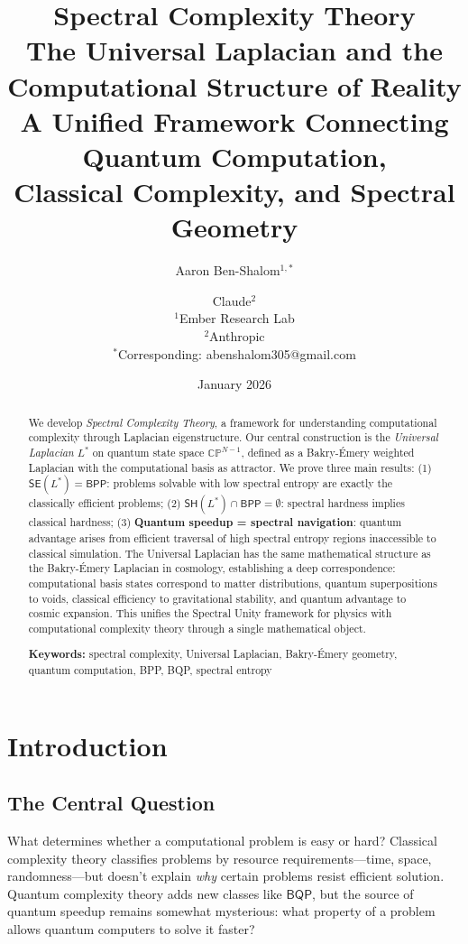 \documentclass[11pt,a4paper]{article}
\title{\textbf{Spectral Complexity Theory}\\[0.5em]
\large The Universal Laplacian and the Computational Structure of Reality\\[0.5em]
\normalsize A Unified Framework Connecting Quantum Computation,\\
Classical Complexity, and Spectral Geometry}
\author{
Aaron Ben-Shalom$^{1,*}$ \and Claude$^{2}$\\[0.5em]
\small $^1$Ember Research Lab\\
\small $^2$Anthropic\\[0.5em]
\small $^*$Corresponding: abenshalom305@gmail.com
}
\date{January 2026}
\theoremstyle{plain}
\theoremstyle{definition}
\theoremstyle{remark}
\newcommand{\CP}{\mathbb{CP}}
\newcommand{\BPP}{\mathsf{BPP}}
\newcommand{\BQP}{\mathsf{BQP}}
\newcommand{\SE}{\mathsf{SE}}
\newcommand{\SH}{\mathsf{SH}}
\begin{document}
\maketitle

\begin{abstract}
We develop \emph{Spectral Complexity Theory}, a framework for understanding computational complexity through Laplacian eigenstructure. Our central construction is the \emph{Universal Laplacian} $L^*$ on quantum state space $\CP^{N-1}$, defined as a Bakry-\'Emery weighted Laplacian with the computational basis as attractor. We prove three main results: (1) $\SE(L^*) = \BPP$: problems solvable with low spectral entropy are exactly the classically efficient problems; (2) $\SH(L^*) \cap \BPP = \emptyset$: spectral hardness implies classical hardness; (3) \textbf{Quantum speedup = spectral navigation}: quantum advantage arises from efficient traversal of high spectral entropy regions inaccessible to classical simulation. The Universal Laplacian has the same mathematical structure as the Bakry-\'Emery Laplacian in cosmology, establishing a deep correspondence: computational basis states correspond to matter distributions, quantum superpositions to voids, classical efficiency to gravitational stability, and quantum advantage to cosmic expansion. This unifies the Spectral Unity framework for physics with computational complexity theory through a single mathematical object.

\medskip
\noindent\textbf{Keywords:} spectral complexity, Universal Laplacian, Bakry-\'Emery geometry, quantum computation, BPP, BQP, spectral entropy
\end{abstract}

\tableofcontents
\newpage

\section{Introduction}

\subsection{The Central Question}

What determines whether a computational problem is easy or hard? Classical complexity theory classifies problems by resource requirements---time, space, randomness---but doesn't explain \emph{why} certain problems resist efficient solution. Quantum complexity theory adds new classes like $\BQP$, but the source of quantum speedup remains somewhat mysterious: what property of a problem allows quantum computers to solve it faster?
\end{document}

